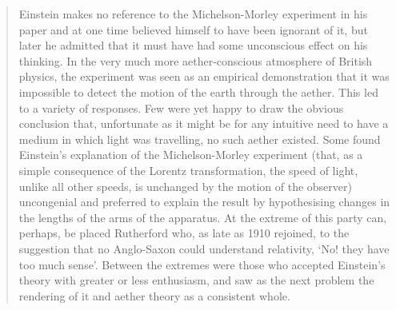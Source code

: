 \begin{quote}
    Einstein makes no reference to the Michelson-Morley experiment in his paper and at one time believed himself to have been ignorant of it, but later he admitted that it must have had some unconscious effect on his thinking.  In the very much more aether-conscious atmosphere of British physics, the experiment was seen as an empirical demonstration that it was impossible to detect the motion of the earth through the aether.  This led to a variety of responses.  Few were yet happy to draw the obvious conclusion that, unfortunate as it might be for any intuitive need to have a medium in which light was travelling, no such aether existed.  Some found Einstein's explanation of the Michelson-Morley experiment (that, as a simple consequence of the Lorentz transformation, the speed of light, unlike all other speeds, is unchanged by the motion of the observer) uncongenial and preferred to explain the result by hypothesising changes in the lengths of the arms of the apparatus.  At the extreme of this party can, perhaps, be placed Rutherford who, as late as 1910 rejoined, to the suggestion that no Anglo-Saxon could understand relativity, `No! they have too much sense'.  Between the extremes were those who accepted Einstein's theory with greater or less enthusiasm, and saw as the next problem the rendering of it and aether theory as a consistent whole.
    
    \citep[p. 16-18]{Kilmister1994}
\end{quote}